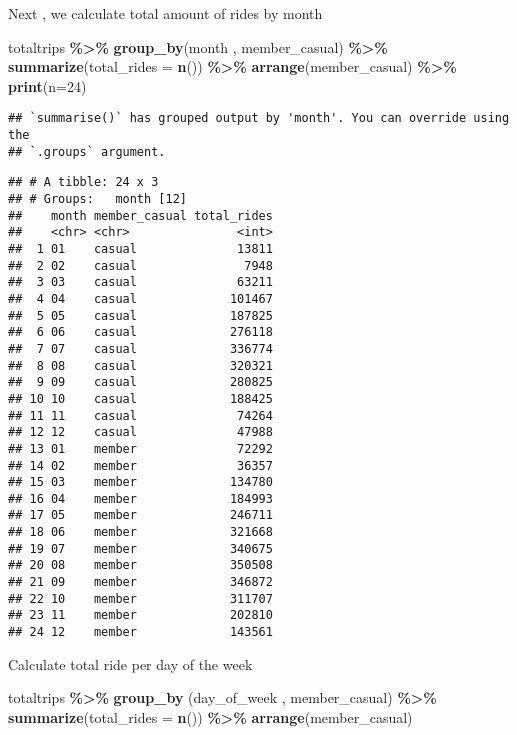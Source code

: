 \documentclass[
]{article}
\newenvironment{Shaded}{\begin{snugshade}}{\end{snugshade}}
\newcommand{\AttributeTok}[1]{\textcolor[rgb]{0.13,0.29,0.53}{#1}}
\newcommand{\DecValTok}[1]{\textcolor[rgb]{0.00,0.00,0.81}{#1}}
\newcommand{\FunctionTok}[1]{\textcolor[rgb]{0.13,0.29,0.53}{\textbf{#1}}}
\newcommand{\NormalTok}[1]{#1}
\newcommand{\SpecialCharTok}[1]{\textcolor[rgb]{0.81,0.36,0.00}{\textbf{#1}}}
\begin{document}
Next , we calculate total amount of rides by month

\begin{Shaded}
\begin{Highlighting}[]
\NormalTok{totaltrips }\SpecialCharTok{\%\textgreater{}\%} \FunctionTok{group\_by}\NormalTok{(month , member\_casual) }\SpecialCharTok{\%\textgreater{}\%} \FunctionTok{summarize}\NormalTok{(}\AttributeTok{total\_rides =} \FunctionTok{n}\NormalTok{()) }\SpecialCharTok{\%\textgreater{}\%} \FunctionTok{arrange}\NormalTok{(member\_casual) }\SpecialCharTok{\%\textgreater{}\%} \FunctionTok{print}\NormalTok{(}\AttributeTok{n=}\DecValTok{24}\NormalTok{)}
\end{Highlighting}
\end{Shaded}

\begin{verbatim}
## `summarise()` has grouped output by 'month'. You can override using the
## `.groups` argument.
\end{verbatim}

\begin{verbatim}
## # A tibble: 24 x 3
## # Groups:   month [12]
##    month member_casual total_rides
##    <chr> <chr>               <int>
##  1 01    casual              13811
##  2 02    casual               7948
##  3 03    casual              63211
##  4 04    casual             101467
##  5 05    casual             187825
##  6 06    casual             276118
##  7 07    casual             336774
##  8 08    casual             320321
##  9 09    casual             280825
## 10 10    casual             188425
## 11 11    casual              74264
## 12 12    casual              47988
## 13 01    member              72292
## 14 02    member              36357
## 15 03    member             134780
## 16 04    member             184993
## 17 05    member             246711
## 18 06    member             321668
## 19 07    member             340675
## 20 08    member             350508
## 21 09    member             346872
## 22 10    member             311707
## 23 11    member             202810
## 24 12    member             143561
\end{verbatim}

Calculate total ride per day of the week

\begin{Shaded}
\begin{Highlighting}[]
\NormalTok{totaltrips }\SpecialCharTok{\%\textgreater{}\%} \FunctionTok{group\_by}\NormalTok{ (day\_of\_week , member\_casual) }\SpecialCharTok{\%\textgreater{}\%} \FunctionTok{summarize}\NormalTok{(}\AttributeTok{total\_rides =} \FunctionTok{n}\NormalTok{()) }\SpecialCharTok{\%\textgreater{}\%} \FunctionTok{arrange}\NormalTok{(member\_casual)}
\end{Highlighting}
\end{Shaded}
\end{document}
